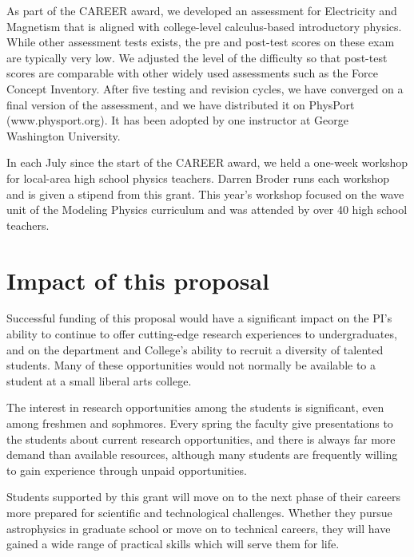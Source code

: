 \documentclass[11pt, preprint]{aastex}
\begin{document}
As part of the CAREER award, we developed an assessment for Electricity and Magnetism that is aligned with college-level
calculus-based introductory physics.  While other assessment tests exists, the pre and post-test scores on these exam are typically very
low.  We adjusted the level of the difficulty so that post-test scores
are comparable with other widely used assessments such as the Force Concept Inventory.  After five testing and revision cycles, we have
converged on a final version of the assessment, and we have distributed it on PhysPort (www.physport.org). It has been adopted by one instructor at George Washington University.


 
In each July since the start of the CAREER award, we held a one-week workshop for local-area high
school physics teachers.  
Darren Broder runs each workshop and is given a  stipend from this
grant.  This year's workshop focused on the wave unit of the Modeling
Physics curriculum and was attended by over 40 high school teachers.



\section{Impact of this proposal}

Successful funding of this proposal would have a significant impact on the PI's
ability to continue to offer cutting-edge research experiences to
undergraduates, and on the department and College's ability to recruit a
diversity of talented students.  Many of these opportunities would not normally
be available to a student at a small liberal arts college.

The interest in research opportunities among the students is significant, even
among freshmen and sophmores.  Every spring the faculty give presentations to
the students about current research opportunities, and there is always far more
demand than available resources, although many students are frequently willing
to gain experience through unpaid opportunities.

Students supported by this grant will move on to the next phase of their careers
more prepared for scientific and technological challenges.  Whether they pursue
astrophysics in graduate school or move on to technical careers, they will have
gained a wide range of practical skills which will serve them for life.
				
\end{document}
